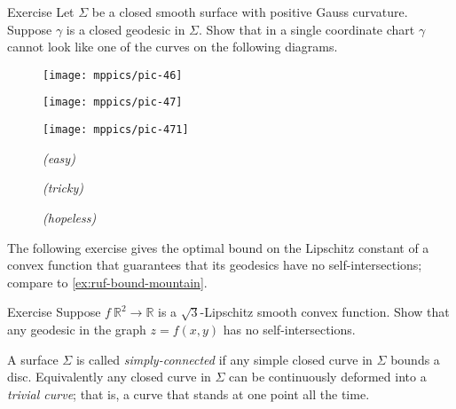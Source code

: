 \begin{thm}{Exercise}\label{ex:self-intersections}
Let $\Sigma$ be a closed smooth surface with positive Gauss curvature. 
Suppose $\gamma$ is a closed geodesic in $\Sigma$.
Show that in a single coordinate chart $\gamma$ cannot look like one of the curves on the following diagrams.

\begin{figure}[h]
\begin{minipage}{.32\textwidth}
\centering
\texttt{[image: mppics/pic-46]}
\end{minipage}
\hfill
\begin{minipage}{.32\textwidth}
\centering
\texttt{[image: mppics/pic-47]}
\end{minipage}
\hfill
\begin{minipage}{.32\textwidth}
\centering
\texttt{[image: mppics/pic-471]}
\end{minipage}

\medskip

\begin{minipage}{.32\textwidth}
\centering
\caption*{\textit{(easy)}}
\end{minipage}
\hfill
\begin{minipage}{.32\textwidth}
\centering
\caption*{\textit{(tricky)}}
\end{minipage}
\hfill
\begin{minipage}{.32\textwidth}
\centering
\caption*{\textit{(hopeless)}}
\end{minipage}
\end{figure}

\end{thm}


The following exercise gives the optimal bound on the Lipschitz constant of a convex function that guarantees that its geodesics have no self-intersections;
compare to \ref{ex:ruf-bound-mountain}.

\begin{thm}{Exercise}\label{ex:sqrt(3)}
Suppose $f\:\mathbb{R}^2\to\mathbb{R}$ is a $\sqrt{3}$-Lipschitz smooth convex function.
Show that any geodesic in the graph $z=f(x,y)$ has no self-intersections.
\end{thm}

A surface $\Sigma$ is called \emph{simply-connected} if any simple closed curve in $\Sigma$ bounds a disc.
Equivalently any closed curve in $\Sigma$ can be continuously deformed into a \emph{trivial curve}; that is, a curve that stands at one point all the time.

